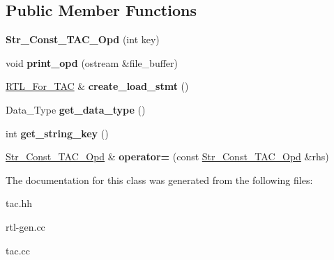 \subsection*{Public Member Functions}
\begin{DoxyCompactItemize}
\item 
\mbox{\label{classStr__Const__TAC__Opd_af2d925815b9ead8a3a7d50bd97a75df5}} 
{\bfseries Str\+\_\+\+Const\+\_\+\+T\+A\+C\+\_\+\+Opd} (int key)
\item 
\mbox{\label{classStr__Const__TAC__Opd_a4c8b0a5d1c9f55ec94dfccdf3a04911e}} 
void {\bfseries print\+\_\+opd} (ostream \&file\+\_\+buffer)
\item 
\mbox{\label{classStr__Const__TAC__Opd_a22b14c23334d18f08270eccea6f027d5}} 
\hyperlink{classRTL__For__TAC}{R\+T\+L\+\_\+\+For\+\_\+\+T\+AC} \& {\bfseries create\+\_\+load\+\_\+stmt} ()
\item 
\mbox{\label{classStr__Const__TAC__Opd_a61991fdf057cc1099d7b56ce59916dc4}} 
Data\+\_\+\+Type {\bfseries get\+\_\+data\+\_\+type} ()
\item 
\mbox{\label{classStr__Const__TAC__Opd_a40b5c53396c6275c3601a9b3a8a3ff82}} 
int {\bfseries get\+\_\+string\+\_\+key} ()
\item 
\mbox{\label{classStr__Const__TAC__Opd_a3c088468ed058a5ee0d764a79a51ecbe}} 
\hyperlink{classStr__Const__TAC__Opd}{Str\+\_\+\+Const\+\_\+\+T\+A\+C\+\_\+\+Opd} \& {\bfseries operator=} (const \hyperlink{classStr__Const__TAC__Opd}{Str\+\_\+\+Const\+\_\+\+T\+A\+C\+\_\+\+Opd} \&rhs)
\end{DoxyCompactItemize}


The documentation for this class was generated from the following files\+:\begin{DoxyCompactItemize}
\item 
tac.\+hh\item 
rtl-\/gen.\+cc\item 
tac.\+cc\end{DoxyCompactItemize}
